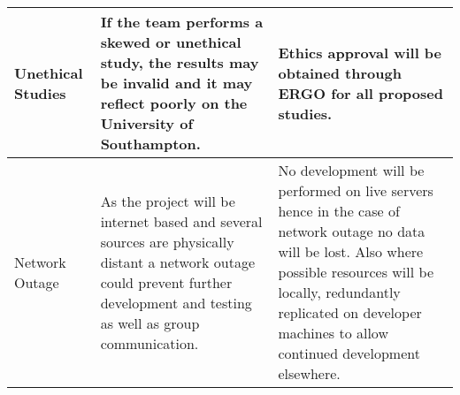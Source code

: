 \begin{center}
\begin{landscape}
\begin{longtable}{>{\raggedright}p{3cm}  >{\raggedright}p{7cm}  p{12cm}}
        Unethical Studies                                & If the team performs a skewed or unethical study, the results may be invalid and it may reflect poorly on the University of Southampton.                                                                                                                                                                                                                                     & Ethics approval will be obtained through ERGO for all proposed studies.                                                                                                                                                                                                                                                                                                                                                                                                                                                                                                                                                                                                                                                                                                                                                                                                                                                                                                                                                                  \\ \midrule
        Network Outage                                   & As the project will be internet based and several sources are physically distant a network outage could prevent further development and testing as well as group communication.                                                                                                                                                                                              & No development will be performed on live servers hence in the case of network outage no data will be lost. Also where possible resources will be locally, redundantly replicated on developer machines to allow continued development elsewhere.                                                                                                                                                                                                                                                                                                                                                                                                                                                                                                                                                                                                                                                                                                                                                                                         \\
        \bottomrule
    \end{longtable}
    \end{landscape}
\end{center}